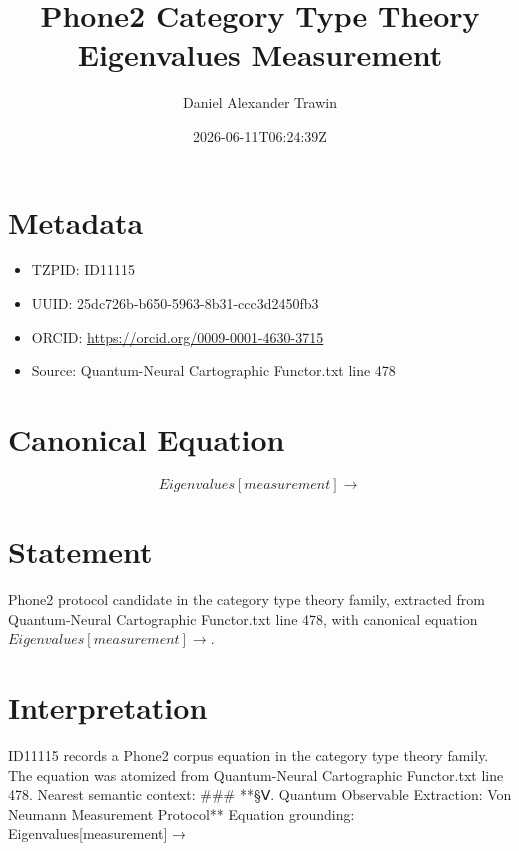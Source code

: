 \documentclass[11pt]{article}
\title{Phone2 Category Type Theory Eigenvalues Measurement}
\author{Daniel Alexander Trawin}
\date{2026-06-11T06:24:39Z}
\begin{document}
\maketitle
\section*{Metadata}
\begin{itemize}
\item TZPID: ID11115
\item UUID: 25dc726b-b650-5963-8b31-ccc3d2450fb3
\item ORCID: \url{https://orcid.org/0009-0001-4630-3715}
\item Source: Quantum-Neural Cartographic Functor.txt line 478
\end{itemize}
\section*{Canonical Equation}
\[
Eigenvalues[measurement] →
\]
\section*{Statement}
Phone2 protocol candidate in the category type theory family, extracted from Quantum-Neural Cartographic Functor.txt line 478, with canonical equation $Eigenvalues[measurement] →$.
\section*{Interpretation}
ID11115 records a Phone2 corpus equation in the category type theory family. The equation was atomized from Quantum-Neural Cartographic Functor.txt line 478. Nearest semantic context: ### **§Ⅴ. Quantum Observable Extraction: Von Neumann Measurement Protocol** Equation grounding: Eigenvalues[measurement] →
\end{document}
